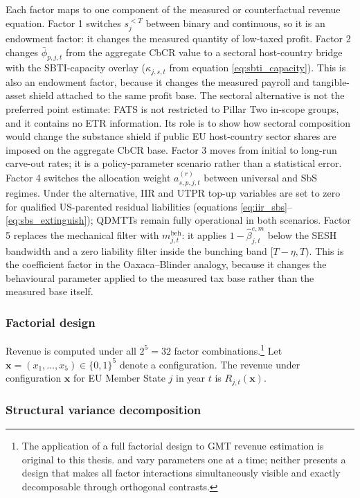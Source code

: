 \documentclass[11pt,a4paper]{article}
\begin{document}
Each factor maps to one component of the measured or counterfactual revenue equation. Factor 1 switches $s_j^{<T}$ between binary and continuous, so it is an endowment factor: it changes the measured quantity of low-taxed profit. Factor 2 changes $\bar{\phi}_{p,j,t}$ from the aggregate CbCR value to a sectoral host-country bridge with the SBTI-capacity overlay ($\kappa_{j,s,t}$ from equation \ref{eq:sbti_capacity}). This is also an endowment factor, because it changes the measured payroll and tangible-asset shield attached to the same profit base. The sectoral alternative is not the preferred point estimate: FATS is not restricted to Pillar Two in-scope groups, and it contains no ETR information. Its role is to show how sectoral composition would change the substance shield if public EU host-country sector shares are imposed on the aggregate CbCR base. Factor 3 moves from initial to long-run carve-out rates; it is a policy-parameter scenario rather than a statistical error. Factor 4 switches the allocation weight $a_{s,p,j,t}^{(r)}$ between universal and SbS regimes. Under the alternative, IIR and UTPR top-up variables are set to zero for qualified US-parented residual liabilities (equations \ref{eq:iir_sbs}--\ref{eq:sbs_extinguish}); QDMTTs remain fully operational in both scenarios. Factor 5 replaces the mechanical filter with $m_{j,t}^{\text{beh}}$: it applies $1-\hat{\beta}_{j,t}^{e,m}$ below the SESH bandwidth and a zero liability filter inside the bunching band $[T-\eta,T)$. This is the coefficient factor in the Oaxaca--Blinder analogy, because it changes the behavioural parameter applied to the measured tax base rather than the measured base itself.

\subsubsection{Factorial design}\label{sec:factorial}

Revenue is computed under all $2^5 = 32$ factor combinations.\footnote{The application of a full factorial design to GMT revenue estimation is original to this thesis. \citet{barake2022} and \citet{hugger2026} vary parameters one at a time; neither presents a design that makes all factor interactions simultaneously visible and exactly decomposable through orthogonal contrasts.} Let $\mathbf{x} = (x_1, \ldots, x_5) \in \{0, 1\}^5$ denote a configuration. The revenue under configuration $\mathbf{x}$ for EU Member State $j$ in year $t$ is $R_{j,t}(\mathbf{x})$.

\subsubsection{Structural variance decomposition}\label{sec:anova}
\end{document}
